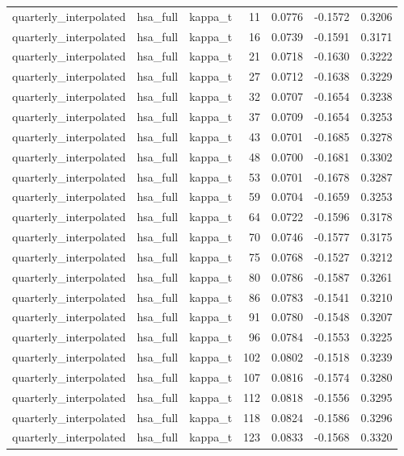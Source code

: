 \begin{tabular}{lllrrrr}
quarterly\_interpolated & hsa\_full & kappa\_t & 11 & 0.0776 & -0.1572 & 0.3206 \\
quarterly\_interpolated & hsa\_full & kappa\_t & 16 & 0.0739 & -0.1591 & 0.3171 \\
quarterly\_interpolated & hsa\_full & kappa\_t & 21 & 0.0718 & -0.1630 & 0.3222 \\
quarterly\_interpolated & hsa\_full & kappa\_t & 27 & 0.0712 & -0.1638 & 0.3229 \\
quarterly\_interpolated & hsa\_full & kappa\_t & 32 & 0.0707 & -0.1654 & 0.3238 \\
quarterly\_interpolated & hsa\_full & kappa\_t & 37 & 0.0709 & -0.1654 & 0.3253 \\
quarterly\_interpolated & hsa\_full & kappa\_t & 43 & 0.0701 & -0.1685 & 0.3278 \\
quarterly\_interpolated & hsa\_full & kappa\_t & 48 & 0.0700 & -0.1681 & 0.3302 \\
quarterly\_interpolated & hsa\_full & kappa\_t & 53 & 0.0701 & -0.1678 & 0.3287 \\
quarterly\_interpolated & hsa\_full & kappa\_t & 59 & 0.0704 & -0.1659 & 0.3253 \\
quarterly\_interpolated & hsa\_full & kappa\_t & 64 & 0.0722 & -0.1596 & 0.3178 \\
quarterly\_interpolated & hsa\_full & kappa\_t & 70 & 0.0746 & -0.1577 & 0.3175 \\
quarterly\_interpolated & hsa\_full & kappa\_t & 75 & 0.0768 & -0.1527 & 0.3212 \\
quarterly\_interpolated & hsa\_full & kappa\_t & 80 & 0.0786 & -0.1587 & 0.3261 \\
quarterly\_interpolated & hsa\_full & kappa\_t & 86 & 0.0783 & -0.1541 & 0.3210 \\
quarterly\_interpolated & hsa\_full & kappa\_t & 91 & 0.0780 & -0.1548 & 0.3207 \\
quarterly\_interpolated & hsa\_full & kappa\_t & 96 & 0.0784 & -0.1553 & 0.3225 \\
quarterly\_interpolated & hsa\_full & kappa\_t & 102 & 0.0802 & -0.1518 & 0.3239 \\
quarterly\_interpolated & hsa\_full & kappa\_t & 107 & 0.0816 & -0.1574 & 0.3280 \\
quarterly\_interpolated & hsa\_full & kappa\_t & 112 & 0.0818 & -0.1556 & 0.3295 \\
quarterly\_interpolated & hsa\_full & kappa\_t & 118 & 0.0824 & -0.1586 & 0.3296 \\
quarterly\_interpolated & hsa\_full & kappa\_t & 123 & 0.0833 & -0.1568 & 0.3320 \\

\end{tabular}
